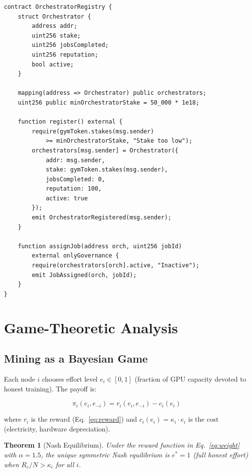 \documentclass[11pt,letterpaper]{article}
\newtheorem{theorem}{Theorem}[section]
\begin{document}
\begin{lstlisting}[language=Solidity,caption=Orchestrator registration]
contract OrchestratorRegistry {
    struct Orchestrator {
        address addr;
        uint256 stake;
        uint256 jobsCompleted;
        uint256 reputation;
        bool active;
    }

    mapping(address => Orchestrator) public orchestrators;
    uint256 public minOrchestratorStake = 50_000 * 1e18;

    function register() external {
        require(gymToken.stakes(msg.sender)
            >= minOrchestratorStake, "Stake too low");
        orchestrators[msg.sender] = Orchestrator({
            addr: msg.sender,
            stake: gymToken.stakes(msg.sender),
            jobsCompleted: 0,
            reputation: 100,
            active: true
        });
        emit OrchestratorRegistered(msg.sender);
    }

    function assignJob(address orch, uint256 jobId)
        external onlyGovernance {
        require(orchestrators[orch].active, "Inactive");
        emit JobAssigned(orch, jobId);
    }
}
\end{lstlisting}

\section{Game-Theoretic Analysis}
\label{sec:game-theory}

\subsection{Mining as a Bayesian Game}

Each node $i$ chooses effort level $e_i \in [0, 1]$ (fraction of GPU capacity devoted to honest training).  The payoff is:

\begin{equation}
    \pi_i(e_i, e_{-i}) = r_i(e_i, e_{-i}) - c_i(e_i)
\end{equation}

where $r_i$ is the reward (Eq.~\ref{eq:reward}) and $c_i(e_i) = \kappa_i \cdot e_i$ is the cost (electricity, hardware depreciation).

\begin{theorem}[Nash Equilibrium]
Under the reward function in Eq.~\ref{eq:weight} with $\alpha = 1.5$, the unique symmetric Nash equilibrium is $e^* = 1$ (full honest effort) when $R_e / N > \kappa_i$ for all $i$.
\end{theorem}
\end{document}
